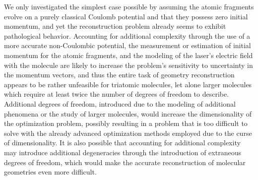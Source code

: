 We only investigated the simplest case possible by assuming the atomic fragments evolve on a purely classical Coulomb potential and that they possess zero initial momentum, and yet the reconstruction problem already seems to exhibit pathological behavior. Accounting for additional complexity through the use of a more accurate non-Coulombic potential, the measurement or estimation of initial momentum for the atomic fragments, and the modeling of the laser's electric field with the molecule are likely to increase the problem's sensitivity to uncertainty in the momentum vectors, and thus the entire task of geometry reconstruction appears to be rather unfeasible for triatomic molecules, let alone larger molecules which require at least twice the number of degrees of freedom to describe. Additional degrees of freedom, introduced due to the modeling of additional phenomena or the study of larger molecules, would increase the dimensionality of the optimization problem, possibly resulting in a problem that is too difficult to solve with the already advanced optimization methods employed due to the curse of dimensionality. It is also possible that accounting for additional complexity may introduce additional degeneracies through the introduction of extraneous degrees of freedom, which would make the accurate reconstruction of molecular geometries even more difficult.

